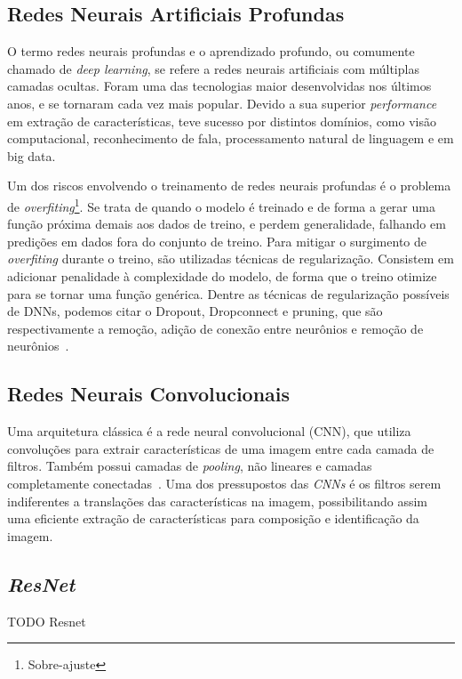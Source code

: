 \subsection{Redes Neurais Artificiais Profundas}\label{sec:Cap2_redes_neurais_profundas}
O termo redes neurais profundas e o aprendizado profundo, ou comumente chamado de \textit{deep learning}, se refere a redes neurais artificiais com múltiplas camadas ocultas. Foram uma das tecnologias maior desenvolvidas nos últimos anos, e se tornaram cada vez mais popular. Devido a sua superior \textit{performance} em extração de características, teve sucesso por distintos domínios, como visão computacional, reconhecimento de fala, processamento natural de linguagem e em big data. 

Um dos riscos envolvendo o treinamento de redes neurais profundas é o problema de \textit{overfiting}\footnote{Sobre-ajuste}. Se trata de quando o modelo é treinado e de forma a gerar uma função próxima demais aos dados de treino, e perdem generalidade, falhando em predições em dados fora do conjunto de treino. Para mitigar o surgimento de \textit{overfiting} durante o treino, são utilizadas técnicas de regularização. Consistem em adicionar penalidade à complexidade do modelo, de forma que o treino otimize para se tornar uma função genérica. Dentre as técnicas de regularização possíveis de DNNs, podemos citar o Dropout, Dropconnect e pruning, que são respectivamente a remoção, adição de conexão entre neurônios e remoção de neurônios~\cite{hastie01statisticallearning}.


\subsection{Redes Neurais Convolucionais}\label{sec:Cap2_redes_neurais_convolucionais}
Uma arquitetura clássica é a rede neural convolucional (CNN), que utiliza convoluções para extrair características de uma imagem entre cada camada de filtros. Também possui camadas de \textit{pooling}, não lineares e camadas completamente conectadas~\cite{8308186}. Uma dos pressupostos das \textit{CNNs} é os filtros serem indiferentes a translações das características na imagem, possibilitando assim uma eficiente extração de características para composição e identificação da imagem.



\subsection{\textit{ResNet}}\label{sec:Cap2_ResNet}
TODO Resnet


